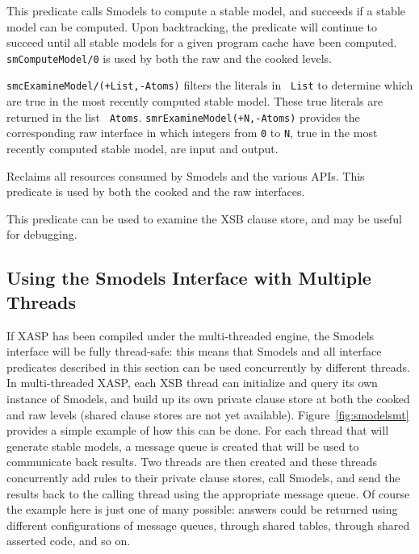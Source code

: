 \begin{description}
%
This predicate calls Smodels to compute a stable model, and succeeds
if a stable model can be computed.  Upon backtracking, the predicate
will continue to succeed until all stable models for a given program
cache have been computed.  {\tt smComputeModel/0} is used by both the
raw and the cooked levels.

%
{\tt smcExamineModel/(+List,-Atoms)} filters the literals in {\tt
  List} to determine which are true in the most recently computed
stable model.  These true literals are returned in the list {\tt
  Atoms}.  {\tt smrExamineModel(+N,-Atoms)} provides the corresponding
raw interface in which integers from {\tt 0} to {\tt N}, true in the
most recently computed stable model, are input and output.

%
Reclaims all resources consumed by Smodels and the various APIs.  This
predicate is used by both the cooked and the raw interfaces.

%
This predicate can be used to examine the XSB clause store, and may
be useful for debugging.

\end{description}

\subsection{Using the Smodels Interface with Multiple Threads}
%
If XASP has been compiled under the multi-threaded engine, the Smodels
interface will be fully thread-safe: this means that Smodels and all
interface predicates described in this section can be used
concurrently by different threads.  In multi-threaded XASP, each XSB
thread can initialize and query its own instance of Smodels, and build
up its own private clause store at both the cooked and raw levels
(shared clause stores are not yet available).
Figure~\ref{fig:smodelsmt} provides a simple example of how this can
be done.  For each thread that will generate stable models, a message
queue is created that will be used to communicate back results.  Two
threads are then created and these threads concurrently add rules to
their private clause stores, call Smodels, and send the results back
to the calling thread using the appropriate message queue.  Of course
the example here is just one of many possible: answers could be
returned using different configurations of message queues, through
shared tables, through shared asserted code, and so on. 

